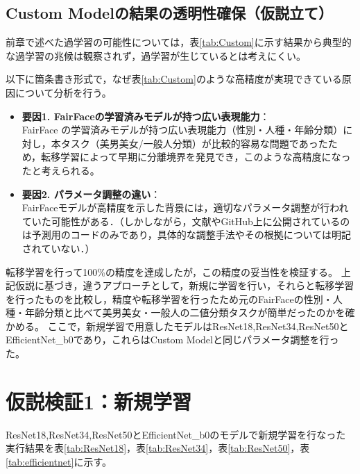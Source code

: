 \documentclass[a4paper,11pt,titlepage]{jsarticle}
\begin{document}
\subsection{Custom Modelの結果の透明性確保（仮説立て）}
\label{label:仮設立て}

前章で述べた過学習の可能性については，表\ref{tab:Custom}に示す結果から典型的な過学習の兆候は観察されず，過学習が生じているとは考えにくい。\par

以下に箇条書き形式で，なぜ表\ref{tab:Custom}のような高精度が実現できている原因について分析を行う。

\begin{itemize}
  \item \textbf{要因1. FairFaceの学習済みモデルが持つ広い表現能力}：  \\
  FairFace の学習済みモデルが持つ広い表現能力（性別・人種・年齢分類）に対し，本タスク（美男美女/一般人分類）が比較的容易な問題であったため，転移学習によって早期に分離境界を発見でき，このような高精度になったと考えられる。

  \item \textbf{要因2. パラメータ調整の違い}：  \\
  FairFaceモデルが高精度を示した背景には，適切なパラメータ調整が行われていた可能性がある．（しかしながら，文献\cite{karkkainenFairFace}やGitHub上に公開されているのは予測用のコードのみであり，具体的な調整手法やその根拠については明記されていない．）
\end{itemize}

転移学習を行って100\%の精度を達成したが，この精度の妥当性を検証する。
上記仮説に基づき，違うアプローチとして，新規に学習を行い，それらと転移学習を行ったものを比較し，精度や転移学習を行ったため元のFairFaceの性別・人種・年齢分類と比べて美男美女・一般人の二値分類タスクが簡単だったのかを確かめる。
ここで，新規学習で用意したモデルはResNet18,ResNet34,ResNet50とEfficientNet\_b0であり，これらはCustom Modelと同じパラメータ調整を行った。


\section{仮説検証1：新規学習}
ResNet18,ResNet34,ResNet50とEfficientNet\_b0のモデルで新規学習を行なった実行結果を表\ref{tab:ResNet18}，表\ref{tab:ResNet34}，表\ref{tab:ResNet50}，表\ref{tab:efficientnet}に示す。
\end{document}

